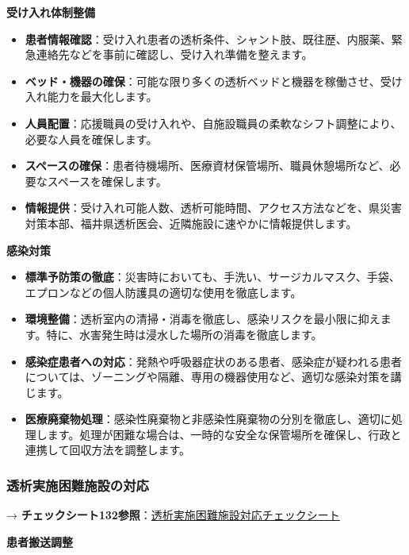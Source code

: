 \documentclass[
  japanese,
  letterpaper,
  DIV=11,
  numbers=noendperiod]{scrartcl}
\providecommand{\tightlist}{%
  \setlength{\itemsep}{0pt}\setlength{\parskip}{0pt}}
\begin{document}
\textbf{受け入れ体制整備}

\begin{itemize}
\tightlist
\item
  \textbf{患者情報確認}：受け入れ患者の透析条件、シャント肢、既往歴、内服薬、緊急連絡先などを事前に確認し、受け入れ準備を整えます。
\item
  \textbf{ベッド・機器の確保}：可能な限り多くの透析ベッドと機器を稼働させ、受け入れ能力を最大化します。
\item
  \textbf{人員配置}：応援職員の受け入れや、自施設職員の柔軟なシフト調整により、必要な人員を確保します。
\item
  \textbf{スペースの確保}：患者待機場所、医療資材保管場所、職員休憩場所など、必要なスペースを確保します。
\item
  \textbf{情報提供}：受け入れ可能人数、透析可能時間、アクセス方法などを、県災害対策本部、福井県透析医会、近隣施設に速やかに情報提供します。
\end{itemize}

\textbf{感染対策}

\begin{itemize}
\tightlist
\item
  \textbf{標準予防策の徹底}：災害時においても、手洗い、サージカルマスク、手袋、エプロンなどの個人防護具の適切な使用を徹底します。
\item
  \textbf{環境整備}：透析室内の清掃・消毒を徹底し、感染リスクを最小限に抑えます。特に、水害発生時は浸水した場所の消毒を徹底します。
\item
  \textbf{感染症患者への対応}：発熱や呼吸器症状のある患者、感染症が疑われる患者については、ゾーニングや隔離、専用の機器使用など、適切な感染対策を講じます。
\item
  \textbf{医療廃棄物処理}：感染性廃棄物と非感染性廃棄物の分別を徹底し、適切に処理します。処理が困難な場合は、一時的な安全な保管場所を確保し、行政と連携して回収方法を調整します。
\end{itemize}

\subsubsection{透析実施困難施設の対応}\label{ux900fux6790ux5b9fux65bdux56f0ux96e3ux65bdux8a2dux306eux5bfeux5fdc}

→
\textbf{チェックシート132参照}：\href{1431_透析実施困難施設対応チェックシート.qmd}{透析実施困難施設対応チェックシート}

\textbf{患者搬送調整}
\end{document}
